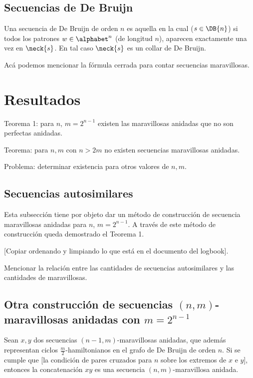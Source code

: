 \subsection{Secuencias de De Bruijn}

Una secuencia de De Bruijn de orden $n$ es aquella en la cual
($s \in \DB{n}$) si todos los patrones $w \in \alphabet^n$ (de longitud $n$),
aparecen exactamente una vez en $\neck{s}$. En tal caso $\neck{s}$ es un
collar de De Bruijn.

Acá podemos mencionar la fórmula cerrada para contar secuencias maravillosas.

\section{Resultados}

Teorema 1: para $n$, $m = 2^{n-1}$ existen las maravillosas anidadas que no son perfectas anidadas.

Teorema: para $n, m$ con $n > 2m$ no existen secuencias maravillosas anidadas.

Problema: determinar existencia para otros valores de $n, m$.

\subsection{Secuencias autosimilares}

Esta subsección tiene por objeto dar un método de construcción de secuencia
maravillosas anidadas
para $n$, $m = 2^{n - 1}$. A través de este método
de construcción queda demostrado el Teorema 1.

  [Copiar ordenando y limpiando lo que está en el documento del logbook].

Mencionar la relación entre las cantidades de secuencias autosimilares y las cantidades de maravillosas.

\subsection{Otra construcción de secuencias $(n,m)$-maravillosas anidadas con $m = 2^{n - 1}$}

\begin{lema}
  Sean $x, y$ dos secuencias $(n - 1, m)$-maravillosas anidadas, que además representan ciclos $\frac{m}{2}$-hamiltonianos en el grafo de De Bruijn de orden $n$. Si se cumple que [la condición de pares cruzados para $n$ sobre los extremos de $x$ e $y$], entonces la concatenación
  $xy$ es una secuencia $(n, m)$-maravillosa anidada.
\end{lema}

